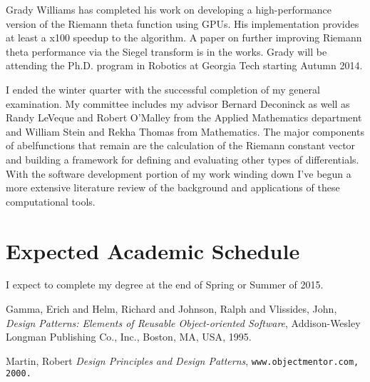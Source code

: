 \documentclass[11pt]{amsart}
\begin{document}
Grady Williams has completed his work on developing a high-performance
version of the Riemann theta function using GPUs. His implementation
provides at least a x100 speedup to the algorithm. A paper on further
improving Riemann theta performance via the Siegel transform is in the
works. Grady will be attending the Ph.D. program in Robotics at Georgia
Tech starting Autumn 2014.

I ended the winter quarter with the successful completion of my general
examination. My committee includes my advisor Bernard Deconinck as well
as Randy LeVeque and Robert O'Malley from the Applied Mathematics
department and William Stein and Rekha Thomas from Mathematics. The
major components of {\sc abelfunctions} that remain are the calculation
of the Riemann constant vector and building a framework for defining and
evaluating other types of differentials.  With the software development
portion of my work winding down I've begun a more extensive literature
review of the background and applications of these computational tools.

\section*{Expected Academic Schedule}

I expect to complete my degree at the end of Spring or Summer of 2015.



\begin{thebibliography}{9}
 Gamma, Erich and Helm, Richard and Johnson, Ralph
  and Vlissides, John, \emph{Design Patterns: Elements of Reusable
    Object-oriented Software}, {Addison-Wesley Longman Publishing Co.,
    Inc.}, {Boston, MA, USA}, {1995}.

 Martin, Robert \emph{Design Principles and Design
  Patterns}, \tt{www.objectmentor.com}, {2000}.


\end{thebibliography}
\end{document}

